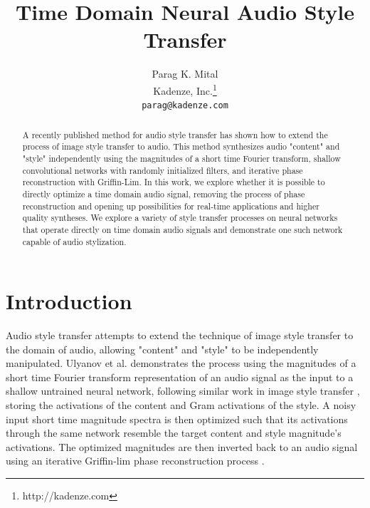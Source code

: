 \documentclass{article}
\title{Time Domain Neural Audio Style Transfer}
\author{
  Parag K. Mital\\
  Kadenze, Inc.\thanks{http://kadenze.com}\\
  \texttt{parag@kadenze.com} \\
}
\begin{document}

\maketitle

\begin{abstract}
  A recently published method for audio style transfer has shown how to extend the process of image style transfer to audio.  This method synthesizes audio "content" and "style" independently using the magnitudes of a short time Fourier transform, shallow convolutional networks with randomly initialized filters, and iterative phase reconstruction with Griffin-Lim.  In this work, we explore whether it is possible to directly optimize a time domain audio signal, removing the process of phase reconstruction and opening up possibilities for real-time applications and higher quality syntheses.  We explore a variety of style transfer processes on neural networks that operate directly on time domain audio signals and demonstrate one such network capable of audio stylization.
\end{abstract}

\section{Introduction}


Audio style transfer \cite{Ulyanov2016} attempts to extend the technique of image style transfer \cite{Gatys} to the domain of audio, allowing "content" and "style" to be independently manipulated.  Ulyanov et al. demonstrates the process using the magnitudes of a short time Fourier transform representation of an audio signal as the input to a shallow untrained neural network, following similar work in image style transfer \cite{Ulyanov2016b}, storing the activations of the content and Gram activations of the style.  A noisy input short time magnitude spectra is then optimized such that its activations through the same network resemble the target content and style magnitude's activations.  The optimized magnitudes are then inverted back to an audio signal using an iterative Griffin-lim phase reconstruction process \cite{Griffin1984}.
\end{document}
